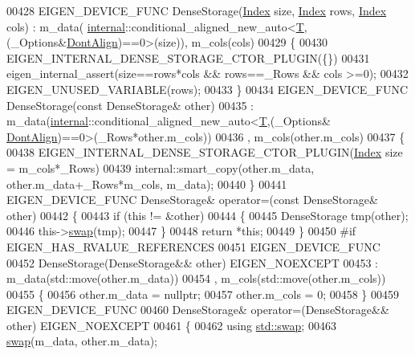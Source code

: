 \begin{DoxyCode}
00428     EIGEN\_DEVICE\_FUNC DenseStorage(\hyperlink{namespace_eigen_a62e77e0933482dafde8fe197d9a2cfde}{Index} size, \hyperlink{namespace_eigen_a62e77e0933482dafde8fe197d9a2cfde}{Index} rows, \hyperlink{namespace_eigen_a62e77e0933482dafde8fe197d9a2cfde}{Index} cols) : m\_data(
      \hyperlink{namespaceinternal}{internal}::conditional\_aligned\_new\_auto<\hyperlink{group___sparse_core___module_class_eigen_1_1_triplet}{T},(\_Options&\hyperlink{group__enums_ggaacded1a18ae58b0f554751f6cdf9eb13a40a452614141522dd313363dbbd65726}{DontAlign})==0>(size)), m\_cols(cols)
00429     \{
00430       EIGEN\_INTERNAL\_DENSE\_STORAGE\_CTOR\_PLUGIN(\{\})
00431       eigen\_internal\_assert(size==rows*cols && rows==\_Rows && cols >=0);
00432       EIGEN\_UNUSED\_VARIABLE(rows);
00433     \}
00434     EIGEN\_DEVICE\_FUNC DenseStorage(\textcolor{keyword}{const} DenseStorage& other)
00435       : m\_data(\hyperlink{namespaceinternal}{internal}::conditional\_aligned\_new\_auto<\hyperlink{group___sparse_core___module_class_eigen_1_1_triplet}{T},(\_Options&
      \hyperlink{group__enums_ggaacded1a18ae58b0f554751f6cdf9eb13a40a452614141522dd313363dbbd65726}{DontAlign})==0>(\_Rows*other.m\_cols))
00436       , m\_cols(other.m\_cols)
00437     \{
00438       EIGEN\_INTERNAL\_DENSE\_STORAGE\_CTOR\_PLUGIN(\hyperlink{namespace_eigen_a62e77e0933482dafde8fe197d9a2cfde}{Index} size = m\_cols*\_Rows)
00439       internal::smart\_copy(other.m\_data, other.m\_data+\_Rows*m\_cols, m\_data);
00440     \}
00441     EIGEN\_DEVICE\_FUNC DenseStorage& operator=(\textcolor{keyword}{const} DenseStorage& other)
00442     \{
00443       \textcolor{keywordflow}{if} (\textcolor{keyword}{this} != &other)
00444       \{
00445         DenseStorage tmp(other);
00446         this->\hyperlink{endian_8c_a3ca5ecd34b04d6a243c054ac3a57f68d}{swap}(tmp);
00447       \}
00448       \textcolor{keywordflow}{return} *\textcolor{keyword}{this};
00449     \}    
00450 \textcolor{preprocessor}{#if EIGEN\_HAS\_RVALUE\_REFERENCES}
00451     EIGEN\_DEVICE\_FUNC
00452     DenseStorage(DenseStorage&& other) EIGEN\_NOEXCEPT
00453       : m\_data(std::move(other.m\_data))
00454       , m\_cols(std::move(other.m\_cols))
00455     \{
00456       other.m\_data = \textcolor{keyword}{nullptr};
00457       other.m\_cols = 0;
00458     \}
00459     EIGEN\_DEVICE\_FUNC
00460     DenseStorage& operator=(DenseStorage&& other) EIGEN\_NOEXCEPT
00461     \{
00462       \textcolor{keyword}{using} \hyperlink{endian_8c_a3ca5ecd34b04d6a243c054ac3a57f68d}{std::swap};
00463       \hyperlink{endian_8c_a3ca5ecd34b04d6a243c054ac3a57f68d}{swap}(m\_data, other.m\_data);

\end{DoxyCode}
